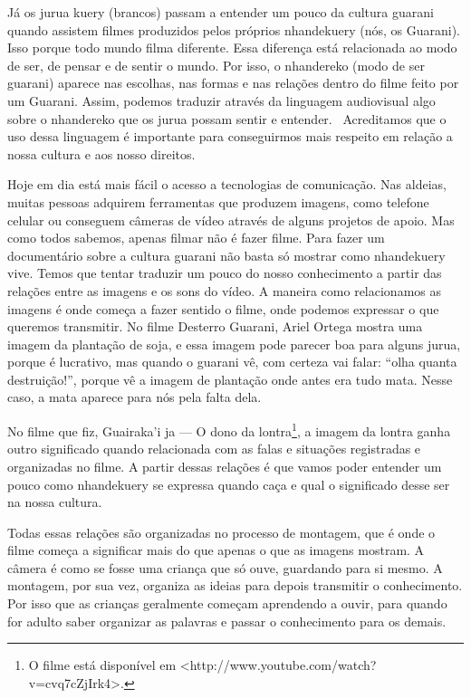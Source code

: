 \documentclass{article}
\begin{document}
J\'a os jurua kuery (brancos) passam a entender um pouco da cultura
guarani quando assistem filmes produzidos pelos pr\'oprios nhandekuery
(n\'os, os Guarani). Isso porque todo mundo filma diferente. Essa
diferen\c{c}a est\'a relacionada ao modo de ser, de pensar e de sentir
o mundo. Por isso, o nhandereko (modo de ser guarani) aparece nas
escolhas, nas formas e nas rela\c{c}\~oes dentro do filme feito por um
Guarani. Assim, podemos traduzir atrav\'es da linguagem audiovisual
algo sobre o nhandereko que os jurua possam sentir e entender.~
Acreditamos que o uso dessa linguagem \'e importante para conseguirmos
mais respeito em rela\c{c}\~ao a nossa cultura e aos nosso direitos.

Hoje em dia est\'a mais f\'acil o acesso a tecnologias de
comunica\c{c}\~ao. Nas aldeias, muitas pessoas adquirem ferramentas que
produzem imagens, como telefone celular ou conseguem c\^ameras de
v\'ideo atrav\'es de alguns projetos de apoio. Mas como todos sabemos,
apenas filmar n\~ao \'e fazer filme. Para fazer um document\'ario sobre
a cultura guarani n\~ao basta s\'o mostrar como nhandekuery vive. Temos
que tentar traduzir um pouco do nosso conhecimento a partir das
rela\c{c}\~oes entre as imagens e os sons do v\'ideo. A maneira como
relacionamos as imagens \'e onde come\c{c}a a fazer sentido o filme,
onde podemos expressar o que queremos transmitir. No filme Desterro
Guarani, Ariel Ortega mostra uma imagem da planta\c{c}\~ao de soja, e
essa imagem pode parecer boa para alguns jurua, porque \'e lucrativo,
mas quando o guarani v\^e, com certeza vai falar:
{\textquotedblleft}olha quanta destrui\c{c}\~ao!{\textquotedblright},
porque v\^e a imagem de planta\c{c}\~ao onde antes era tudo mata. Nesse
caso, a mata aparece para n\'os pela falta dela. 

No filme que fiz, Guairaka{\textquoteright}i ja --- O dono da
lontra\footnote{ O filme est\'a dispon\'ivel em
{\textless}http://www.youtube.com/watch?v=cvq7cZjIrk4{\textgreater}.},
a imagem da lontra ganha outro significado quando relacionada com as
falas e situa\c{c}\~oes registradas e organizadas no filme. A partir
dessas rela\c{c}\~oes \'e que vamos poder entender um pouco como
nhandekuery se expressa quando ca\c{c}a e qual o significado desse ser
na nossa cultura. 

Todas essas rela\c{c}\~oes s\~ao organizadas no processo de montagem,
que \'e onde o filme come\c{c}a a significar mais do que apenas o que
as imagens mostram. A c\^amera \'e como se fosse uma crian\c{c}a que
s\'o ouve, guardando para si mesmo. A montagem, por sua vez, organiza
as ideias para depois transmitir o conhecimento. Por isso que as
crian\c{c}as geralmente come\c{c}am aprendendo a ouvir, para quando for
adulto saber organizar as palavras e passar o conhecimento para os
demais.
\end{document}
